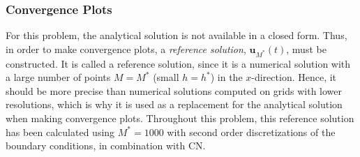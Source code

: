 \subsubsection{Convergence Plots}
For this problem, the analytical solution is not available in a closed form. Thus, in order to make convergence plots, a \textit{reference solution}, $\boldsymbol{u}_{M^*}(t)$, must be constructed. It is called a reference solution, since it is a numerical solution with a large number of points $M = M^*$ (small $h = h^*$) in the $x$-direction. Hence, it should be more precise than numerical solutions computed on grids with lower resolutions, which is why it is used as a replacement for the analytical solution when making convergence plots. Throughout this problem, this reference solution has been calculated using $M^* = 1000$ with second order discretizations of the boundary conditions, in combination with CN.

